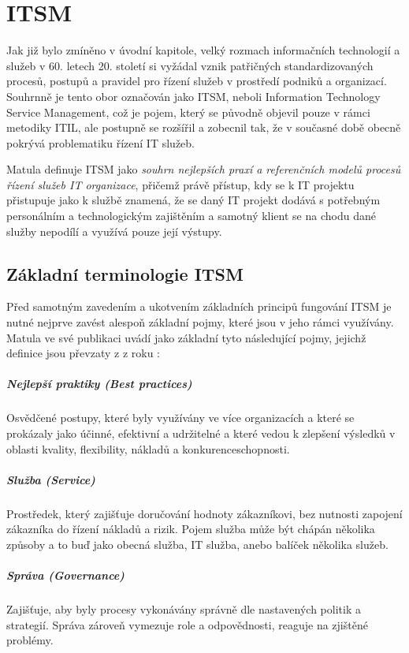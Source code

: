 \documentclass[
  digital,     %
  twoside,     %
  lof,         %
  lot,         %
]{fithesis4}
\begin{document}
\chapter{ITSM}
Jak již bylo zmíněno v úvodní kapitole, velký rozmach informačních technologií a služeb v 60. letech 20. století si vyžádal vznik patřičných standardizovaných procesů, postupů a pravidel pro řízení služeb v prostředí podniků a organizací. Souhrnně je tento obor označován jako ITSM, neboli Information Technology Service Management, což je pojem, který se původně objevil pouze v rámci metodiky ITIL, ale postupně se rozšířil a zobecnil tak, že v současné době obecně pokrývá problematiku řízení IT služeb.\parencite[s.~20]{Matula2017} 

Matula definuje ITSM jako \textit{souhrn nejlepších praxí a referenčních modelů procesů řízení služeb IT organizace}, přičemž právě přístup, kdy se k IT projektu přistupuje jako k službě znamená, že se daný IT projekt dodává s potřebným personálním a technologickým zajištěním a samotný klient se na chodu dané služby nepodílí a využívá pouze její výstupy.\parencite[s.~20-22]{Matula2017}

\section{Základní terminologie ITSM}
Před samotným zavedením a ukotvením základních principů fungování ITSM je nutné nejprve zavést alespoň základní pojmy, které jsou v jeho rámci využívány. Matula ve své publikaci  uvádí jako základní tyto následující pojmy, jejichž definice jsou převzaty z  z roku \citeyear{SyFvQA11lk1OaIec}:
\paragraph{Nejlepší praktiky (Best practices)}
Osvědčené postupy, které byly využívány ve více organizacích a které se prokázaly jako účinné, efektivní a udržitelné a které vedou k zlepšení výsledků v oblasti kvality, flexibility, nákladů a konkurenceschopnosti.
\paragraph{Služba (Service)}
Prostředek, který zajišťuje doručování hodnoty zákazníkovi, bez nutnosti zapojení zákazníka do řízení nákladů a rizik. Pojem služba může být chápán několika způsoby a to buď jako obecná služba, IT služba, anebo balíček několika služeb. 
\paragraph{Správa (Governance)}
Zajišťuje, aby byly procesy vykonávány správně dle nastavených politik a strategií. Správa zároveň vymezuje role a odpovědnosti, reaguje na zjištěné problémy.
\end{document}
